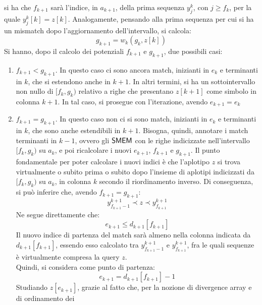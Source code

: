 si ha che $f_{k+1}$ sarà l'indice, in $a_{k+1}$, della prima sequenza $y_j^k$,
con $j\geq f_k$, per la quale $y_j^k[k]=z[k]$. Analogamente, pensando alla prima
sequenza per cui si ha un mismatch dopo l'aggiornamento dell'intervallo, si
calcola: 
\begin{equation}
  \label{eq:pbwtq6}
  g_{k+1}=w_k(g_k,z[k])
\end{equation}
Si hanno, dopo il calcolo dei potenziali $f_{k+1}$ e $g_{k+1}$, due
possibili casi: 
\begin{enumerate}
  \item $f_{k+1}<g_{k+1}$. In questo caso ci sono ancora match,
  inizianti in $e_k$ e terminanti in $k$, che si estendono anche in $k+1$. In
  altri 
  termini, si 
  ha un sottointervallo non nullo di $[f_k, g_k)$ relativo a righe che 
  presentano $z[k+1]$ come simbolo in colonna $k+1$. In tal caso, si
  prosegue con l'iterazione, avendo $e_{k+1}=e_k$
  \item $f_{k+1}=g_{k+1}$. In questo caso non ci si sono match,
  inizianti in $e_k$ e terminanti in $k$, che sono anche estendibili in
  $k+1$. Bisogna, quindi, 
  annotare i match terminanti in $k-1$, ovvero gli $\mbox{\rm {\sf SMEM}}$ con le righe
  indicizzate nell'intervallo
  $[f_k,g_k)$ su $a_k$, 
  e poi ricalcolare i nuovi $e_{k+1}$, $f_{k+1}$ e $g_{k+1}$. Il punto
  fondamentale per poter calcolare i nuovi indici è 
  che l'aplotipo $z$ si trova virtualmente o subito prima o
  subito dopo l'insieme di aplotipi indicizzati da $[f_k,g_k)$ su $a_k$, in
  colonna $k$ secondo il riordinamento inverso.
  Di conseguenza, si può inferire che, avendo $f_{k+1}=g_{k+1}$: 
  \begin{equation}
    \label{eq:pbwtsmem1}
    y_{f_{k+1}-1}^{k+1}\prec z\prec y_{f_{k+1}}^{k+1}
  \end{equation}
  Ne segue direttamente che:
  \begin{equation}
    \label{eq:pbwtsmem2}
    e_{k+1}\leq d_{k+1}[f_{k+1}]
  \end{equation}
  Il nuovo indice di partenza del match sarà almeno nella colonna
  indicata da $d_{k+1}[f_{k+1}]$, essendo esso calcolato tra $
  y_{f_{k+1}-1}^{k+1}$ e $ y_{f_{k+1}}^{k+1}$, fra le quali sequenze è
  virtualmente compresa la query $z$. \\
  Quindi, si considera come punto di partenza:
  \begin{equation}
    \label{eq:pbwtsmem3}
    e_{k+1}=d_{k+1}[f_{k+1}]-1
  \end{equation}
  Studiando $z[e_{k+1}]$, grazie al
  fatto che, per la nozione di divergence array e di ordinamento dei

\end{enumerate}
